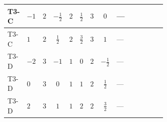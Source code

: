 \documentclass[8pt]{article}
\begin{document}
\begin{landscape}
\begin{longtable}{@{}llcccccc >{\raggedright\arraybackslash}p{0.21\linewidth} >{\raggedright\arraybackslash}p{0.21\linewidth} >{\raggedright\arraybackslash}p{0.21\linewidth}@{}}
\midrule
T3-C & $-1$ & $2$ & $-\frac{1}{2}$ & $2$ & $\frac{1}{2}$ & $3$ & $0$ & --- & \scriptsize\adjustbox{max width=\linewidth}{$\begin{gathered} -\frac{4}{3} \operatorname{Tr}\!\left({y_1}\,\left({y_1}\right)^{\dagger}\,{Y_e}\,\left({Y_e}\right)^{\dagger}\right)\end{gathered}$} & \scriptsize\adjustbox{max width=\linewidth}{$\begin{gathered} +\frac{16}{3} {\lambda_5} \left({\lambda_5}\right)^{*}\end{gathered}$} \\
\midrule
T3-C & $1$ & $2$ & $\frac{1}{2}$ & $2$ & $\frac{3}{2}$ & $3$ & $1$ & --- & \scriptsize\adjustbox{max width=\linewidth}{$\begin{gathered} -\frac{4}{3} \operatorname{Tr}\!\left({y_1}\,\left({y_1}\right)^{\dagger}\,{Y_e}\,\left({Y_e}\right)^{\dagger}\right)\end{gathered}$} & \scriptsize\adjustbox{max width=\linewidth}{$\begin{gathered} +\frac{16}{3} {\lambda_5} \left({\lambda_5}\right)^{*}\end{gathered}$} \\
\midrule
T3-D & $-2$ & $3$ & $-1$ & $1$ & $0$ & $2$ & $-\frac{1}{2}$ & --- & \scriptsize\adjustbox{max width=\linewidth}{$\begin{gathered} -\frac{4}{3} \operatorname{Tr}\!\left({y_1}\,\left({y_1}\right)^{\dagger}\,{Y_e}\,\left({Y_e}\right)^{\dagger}\right)\end{gathered}$} & \scriptsize\adjustbox{max width=\linewidth}{$\begin{gathered} -\frac{8}{3} {\lambda_5} \left({\lambda_5}\right)^{*}\end{gathered}$} \\
\midrule
T3-D & $0$ & $3$ & $0$ & $1$ & $1$ & $2$ & $\frac{1}{2}$ & --- & \scriptsize\adjustbox{max width=\linewidth}{$\begin{gathered} -\frac{4}{3} \operatorname{Tr}\!\left({y_1}\,\left({y_1}\right)^{\dagger}\,{Y_e}\,\left({Y_e}\right)^{\dagger}\right)\end{gathered}$} & \scriptsize\adjustbox{max width=\linewidth}{$\begin{gathered} -\frac{8}{3} {\lambda_5} \left({\lambda_5}\right)^{*}\end{gathered}$} \\
\midrule
T3-D & $2$ & $3$ & $1$ & $1$ & $2$ & $2$ & $\frac{3}{2}$ & --- & \scriptsize\adjustbox{max width=\linewidth}{$\begin{gathered} -\frac{4}{3} \operatorname{Tr}\!\left({y_1}\,\left({y_1}\right)^{\dagger}\,{Y_e}\,\left({Y_e}\right)^{\dagger}\right)\end{gathered}$} & \scriptsize\adjustbox{max width=\linewidth}{$\begin{gathered} -\frac{8}{3} {\lambda_5} \left({\lambda_5}\right)^{*}\end{gathered}$} \\

\end{longtable}
\end{landscape}
\end{document}
